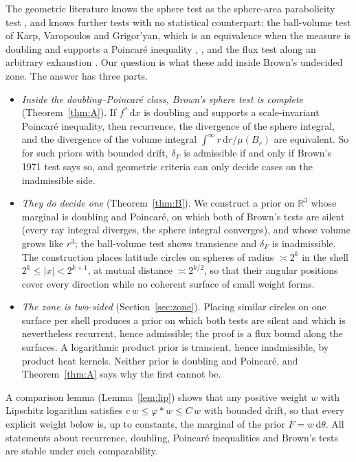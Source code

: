 \documentclass[11pt]{amsart}
\newcommand{\R}{\mathbb{R}}
\newcommand{\dd}{\,\mathrm{d}}
\newcommand{\abs}[1]{\lvert #1\rvert}
\theoremstyle{plain}
\theoremstyle{definition}
\theoremstyle{remark}
\begin{document}
The geometric literature knows the sphere test as the sphere-area parabolicity
test \cite[Thm.~7.5]{grigoryan1999}, and knows further tests with no
statistical counterpart: the ball-volume test of Karp, Varopoulos and
Grigor'yan, which is an equivalence when the measure is doubling and supports a
Poincar\'e inequality \cite[Thm.~11.1]{grigoryan1999},
\cite[Cor.~4.12]{sturm1996}, and the flux test along
an arbitrary exhaustion \cite[Thm.~7.6]{grigoryan1999}. Our question is what
these add inside Brown's undecided zone. The answer has three parts.

\begin{itemize}[leftmargin=2em,itemsep=3pt]
\item[(A)] \emph{Inside the doubling--Poincar\'e class, Brown's sphere test is
complete} (Theorem~\ref{thm:A}). If $f^*\dd x$ is doubling and supports a
scale-invariant Poincar\'e inequality, then recurrence, the divergence of the
sphere integral, and the divergence of the volume integral
$\int^\infty r\dd r/\mu(B_r)$ are equivalent. So for such priors with bounded
drift, $\delta_F$ is admissible if and only if Brown's 1971 test says so, and
geometric criteria can only decide cases on the inadmissible side.
\item[(B)] \emph{They do decide one} (Theorem~\ref{thm:B}). We construct a prior
on $\R^3$ whose marginal is doubling and Poincar\'e, on which both of Brown's
tests are silent (every ray integral diverges, the sphere integral converges),
and whose volume grows like $r^3$; the ball-volume test shows transience and
$\delta_F$ is inadmissible. The construction places latitude circles on spheres of radius
$\asymp2^k$ in the shell $2^k\le\abs x<2^{k+1}$, at mutual distance $\asymp
2^{k/2}$, so that their angular positions cover every direction while no
coherent surface of small weight forms.
\item[(C)] \emph{The zone is two-sided} (Section~\ref{sec:zone}). Placing
similar circles on one surface per shell produces a prior on which both tests are
silent and which is nevertheless recurrent, hence admissible; the proof is a
flux bound along the surfaces. A logarithmic product prior is transient, hence
inadmissible, by product heat kernels. Neither prior is doubling and Poincar\'e,
and Theorem~\ref{thm:A} says why the first cannot be.
\end{itemize}

A comparison lemma (Lemma~\ref{lem:lip}) shows that any positive weight $w$
with Lipschitz logarithm satisfies $c\,w\le\varphi*w\le C\,w$ with bounded
drift, so that every explicit weight below is, up to constants, the marginal of
the prior $F=w\dd\theta$. All statements about recurrence, doubling, Poincar\'e
inequalities and Brown's tests are stable under such comparability.
\end{document}
